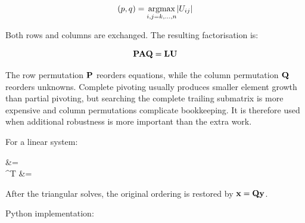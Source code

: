 \begin{equation}
    (p,q)=\underset{i,j=k,\dots,n}{\operatorname{argmax}}| {U_{ij}} |
\end{equation}

Both rows and columns are exchanged. The resulting factorisation is:

\begin{equation}
    \mathbf{P}\mathbf{A}\mathbf{Q}=\mathbf{L}\mathbf{U}
\end{equation}

The row permutation $ \mathbf{P} $ reorders equations, while the column permutation
$ \mathbf{Q} $ reorders unknowns. Complete pivoting usually produces smaller element
growth than partial pivoting, but searching the complete trailing submatrix is
more expensive and column permutations complicate bookkeeping. It is therefore
used when additional robustness is more important than the extra work.

For a linear system:

\begin{eqarray}
     &=  \\
    ^{T} &= 
\end{eqarray}

After the triangular solves, the original ordering is restored by
$ \mathbf{x}=\mathbf{Q}\mathbf{y} $.

Python implementation:

